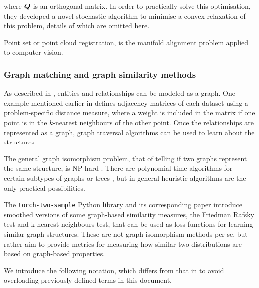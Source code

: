 where $\boldsymbol{Q}$ is an orthogonal matrix. In order to practically solve this optimisation, they developed a novel stochastic algorithm to minimise a convex relaxation of this problem, details of which are omitted here. 

Point set or point cloud registration, is the manifold alignment problem applied to computer vision. 

\subsubsection{Graph matching and graph similarity methods}

As described in \cite{kalinowski2020survey}, entities and relationships can be modeled as a graph. One example mentioned earlier in  \cite{ManifoldLearningTheoryAndApplications} defines adjacency matrices of each dataset using a problem-specific distance measure, where a weight is included in the matrix if one point is in the $k$-nearest neighbours of the other point. Once the relationships are represented as a graph, graph traversal algorithms can be used to learn about the structures. 

The general graph isomorphism problem, that of telling if two graphs represent the same structure, is NP-hard \cite{GraphIsomorphismNPHard}. There are polynomial-time algorithms for certain subtypes of graphs or trees , but in general heuristic algorithms are the only practical possibilities. 

The \texttt{torch-two-sample} Python library and its corresponding paper \cite{torchtwosample} introduce smoothed versions of some graph-based similarity measures, the Friedman Rafsky test and k-nearest neighbours test, that can be used as loss functions for learning similar graph structures. These are not graph isomorphism methods per se, but rather aim to provide metrics for measuring how similar two distributions are based on graph-based properties.

We introduce the following notation, which differs from that in \cite{torchtwosample} to avoid overloading previously defined terms in this document. 

